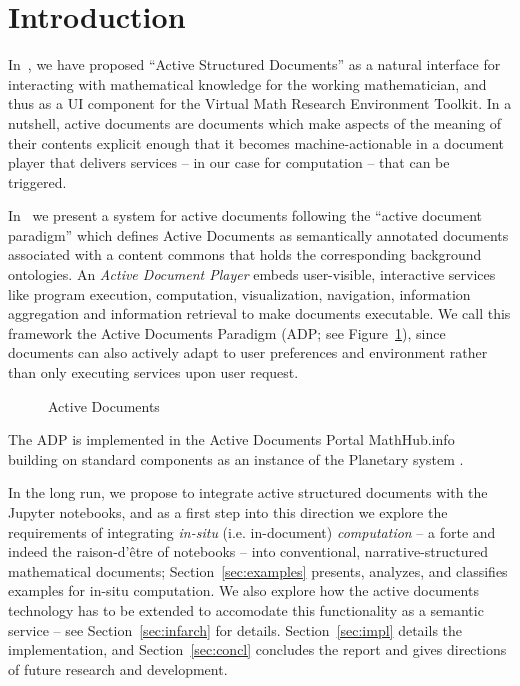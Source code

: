 \section{Introduction}\label{sec:intro}

In~, we have proposed ``Active Structured Documents'' as a natural interface for interacting
with mathematical knowledge for the working mathematician, and thus as a UI component for
the \pn Virtual Math Research Environment Toolkit.
%
In a nutshell, active documents are documents which make aspects of the meaning of their
contents explicit enough that it becomes machine-actionable in a document player that
delivers services -- in our case for computation -- that can be triggered.

In~\cite{KohDavGin:psewads11} we present a system for active documents following the
``active document paradigm'' which defines Active Documents as semantically annotated
documents associated with a content commons that holds the corresponding background
ontologies. An \textit{Active Document Player} embeds user-visible, interactive services
like program execution, computation, visualization, navigation, information aggregation
and information retrieval to make documents executable. We call this framework the Active
Documents Paradigm (ADP; see Figure~\ref{fig:activedocs}), since documents can also
actively adapt to user preferences and environment rather than only executing services
upon user request.
\begin{figure}[ht]\centering
  

  \caption{Active Documents}\label{fig:activedocs}
\end{figure}

The ADP is implemented in the Active Documents Portal MathHub.info~\cite{MathHub:on}
building on standard components as an instance of the Planetary system
\cite{Kohlhase:ppte12}.

In the long run, we propose to integrate active structured documents with the Jupyter
notebooks, and as a first step into this direction we explore the requirements of
integrating \emph{in-situ} (i.e. in-document) \emph{computation} -- a forte and indeed
the raison-d'être of notebooks -- into conventional, narrative-structured mathematical
documents; Section~\ref{sec:examples} presents, analyzes, and classifies examples for
in-situ computation.  We also explore how the active documents technology has to be
extended to accomodate this functionality as a semantic service -- see
Section~\ref{sec:infarch} for details. Section~\ref{sec:impl} details the implementation,
and Section~\ref{sec:concl} concludes the report and gives directions of future research
and development.



